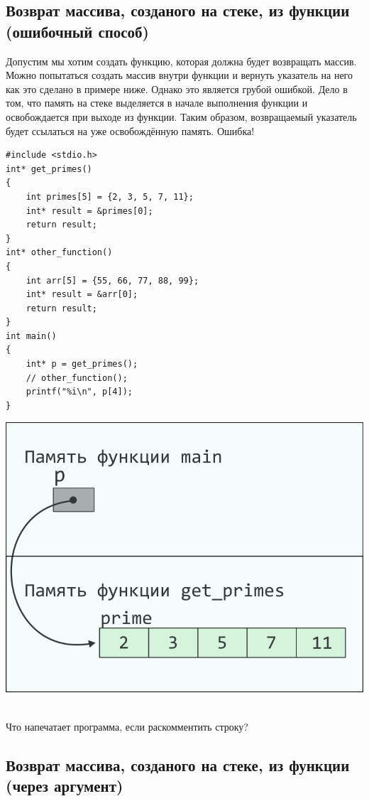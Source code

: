 \documentclass{article}
\begin{document}
\subsection*{Возврат массива, созданого на стеке, из функции (ошибочный способ)}
Допустим мы хотим создать функцию, которая должна будет возвращать массив.
Можно попытаться создать массив внутри функции и вернуть указатель на него как
это сделано в примере ниже.
Однако это является грубой ошибкой. Дело в том, что память на стеке
выделяется в начале выполнения функции и освобождается при выходе из функции.
Таким образом, возвращаемый указатель будет ссылаться на уже освобождённую память. Ошибка!
\noindent\begin{minipage}{.45\textwidth}
\begin{lstlisting}
#include <stdio.h>
int* get_primes() 
{
    int primes[5] = {2, 3, 5, 7, 11};
    int* result = &primes[0];
    return result;
}
int* other_function() 
{
    int arr[5] = {55, 66, 77, 88, 99};
    int* result = &arr[0];
    return result;
}
int main() 
{
    int* p = get_primes();
    // other_function();
    printf("%i\n", p[4]);
}
\end{lstlisting}
\end{minipage}
\begin{minipage}{.45\textwidth}
\includegraphics[scale=0.9]{../images/pointer_schemes/function_return_stack_array.png}
\end{minipage}\\
Что напечатает программа, если раскомментить строку?

\subsection*{Возврат массива, созданого на стеке, из функции (через аргумент)}
\end{document}
